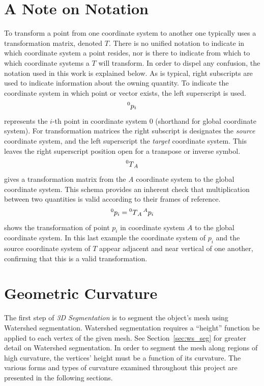 \section{A Note on Notation}
To transform a point from one coordinate system to another one typically uses a transformation matrix, denoted $T$.
There is no unified notation to indicate in which coordinate system a point resides, nor is there to indicate from which to which coordinate systems a $T$ will transform.
In order to dispel any confusion, the notation used in this work is explained below.
As is typical, right subscripts are used to indicate information about the owning quantity.
To indicate the coordinate system in which point or vector exists, the left superscript is used.
\begin{equation*}
	\prescript{0}{}p_i
\end{equation*}
represents the $i$-th point in coordinate system 0 (shorthand for global coordinate system).
For transformation matrices the right subscript is designates the \textit{source} coordinate system, and the left superscript the \textit{target} coordinate system.
This leaves the right superscript position open for a transpose or inverse symbol.
\begin{equation*}
	\prescript{0}{}T_{A}
\end{equation*}
gives a transformation matrix from the \textit{A} coordinate system to the global coordinate system.
This schema provides an inherent check that multiplication between two quantities is valid according to their frames of reference.
\begin{equation*}
	\prescript{0}{}p_i = \prescript{0}{}T_{A} \prescript{A}{}p_i
\end{equation*}
shows the transformation of point $p_i$ in coordinate system $A$ to the global coordinate system.
In this last example the coordinate system of $p_i$ and the source coordinate system of $T$ appear adjacent and near vertical of one another, confirming that this is a valid transformation.

\section{Geometric Curvature}
The first step of \textit{3D Segmentation} is to segment the object's mesh using Watershed segmentation.
Watershed segmentation requires a ``height'' function be applied to each vertex of the given mesh.
See Section~\ref{sec:ws_seg} for greater detail on Watershed segmentation.
In order to segment the mesh along regions of high curvature, the vertices' height must be a function of its curvature.
The various forms and types of curvature examined throughout this project are presented in the following sections.

